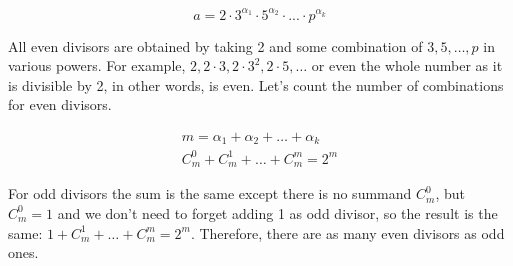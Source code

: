 \documentclass{article}
\begin{document}
\begin{enumerate}
\[a=2 \cdot 3^{\alpha_1} \cdot 5^{\alpha_2} \cdot ... \cdot p^{\alpha_k}\]

All even divisors are obtained by taking 2 and some combination of $3, 5, \ldots{}, p$ in various powers. For example, $2, 2 \cdot 3, 2 \cdot 3^2, 2 \cdot 5, \ldots{}$ or even the whole number as it is divisible by 2, in other words, is even. Let's count the number of combinations for even divisors.

\begin{align*}
m = \alpha_1 + \alpha_2 + \ldots{} + \alpha_k\\
C^0_m+C^1_m+\ldots{}+C^m_m = 2^m
\end{align*} 

For odd divisors the sum is the same except there is no summand $C^0_m$, but $C^0_m=1$ and we don't need to forget adding 1 as odd divisor, so the result is the same: $1 + C^1_m+\ldots{}+C^m_m=2^m$. Therefore, there are as many even divisors as odd ones.

\end{enumerate}
\end{document}

